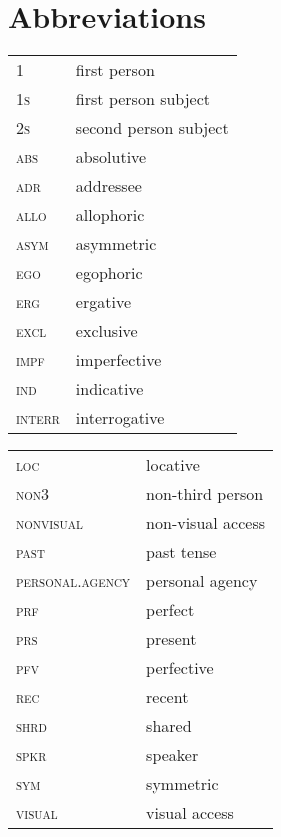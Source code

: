 \documentclass[output=paper]{langsci/langscibook}
\begin{document}
\section*{Abbreviations}
\begin{tabularx}{.45\textwidth}{lQ}
1 & first person\\ 
\textsc{1s} & first person subject\\ 
\textsc{2s} & second person subject\\ 
\textsc{abs} & absolutive\\ 
\textsc{adr} & addressee\\ 
\textsc{allo} & allophoric\\ 
\textsc{asym} & asymmetric\\ 
\textsc{ego} & egophoric\\ 
\textsc{erg} & ergative\\ 
\textsc{excl} & exclusive\\ 
\textsc{impf} & imperfective\\ 
\textsc{ind} & indicative\\ 
\textsc{interr} & interrogative\\ 
\end{tabularx}%
\begin{tabularx}{.53\textwidth}{lQ}
\textsc{loc} & locative\\ 
\textsc{non3} & non-third person\\ 
\textsc{nonvisual} & non-visual access\\ 
\textsc{past} & past tense\\ 
\textsc{personal.agency} & personal agency\\ 
\textsc{prf} & perfect\\ 
\textsc{prs} & present\\ 
\textsc{pfv} & perfective\\ 
\textsc{rec} & recent\\ 
\textsc{shrd} & shared\\ 
\textsc{spkr} & speaker\\
\textsc{sym} & symmetric\\
\textsc{visual} & visual access\\
\end{tabularx}

\sloppy
\printbibliography[heading=subbibliography,notkeyword=this] 
\end{document}

